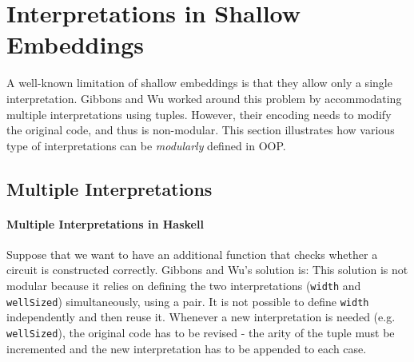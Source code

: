 \section{Interpretations in Shallow Embeddings}

A well-known limitation of shallow embeddings is that they allow only a single
interpretation. Gibbons and Wu worked around this problem by accommodating
multiple interpretations using tuples. However, their encoding needs to modify
the original code, and thus is non-modular. This section illustrates how various type of
interpretations can be \emph{modularly} defined in OOP.
\begin{comment}
Although a modular solution based on \cite{swierstra2008data}
is also presented, it complicates the encoding dramatically and may prevent pratical use.
OO approach, on the contrary, provides modular yet simple solution of defining
multiple interpretations. 
\end{comment}


\subsection{Multiple Interpretations}\label{subsec:multiple}
\paragraph{Multiple Interpretations in Haskell}
Suppose that we want to have an additional function that checks whether a circuit is
constructed correctly. Gibbons and Wu's solution is:
\noindent This solution is not modular because it relies 
on defining the two interpretations (\lstinline{width} and
\lstinline{wellSized}) simultaneously, using a pair. It is not
possible to define \lstinline{width} independently and then reuse it.
Whenever a new interpretation is needed (e.g. \lstinline{wellSized}), the
original code has to be revised -
the arity of the tuple must be incremented and the new interpretation has to be
appended to each case.


